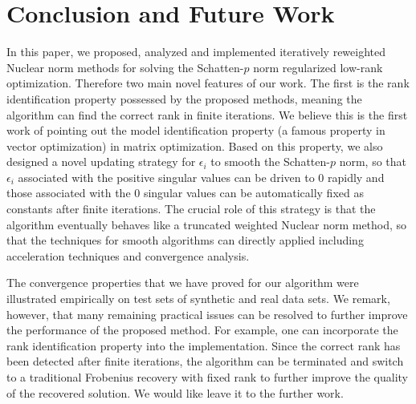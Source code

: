 \documentclass[twoside,11pt]{article}
\numberwithin{equation}{section}
\begin{document}
%
%
%
%
%
%
%






\section{Conclusion and Future Work}
In this paper, we proposed, analyzed and implemented iteratively reweighted Nuclear norm methods 
for solving the Schatten-$p$ norm regularized low-rank optimization. 
Therefore two main novel features of our work.   The first is the 
rank identification property possessed by the proposed methods, meaning the algorithm can find the 
correct rank in finite iterations.  We believe this is the first work of 
pointing out the model identification property (a famous property in vector optimization) in 
matrix optimization.  Based on this property,  we also designed a novel updating strategy 
for $\epsilon_i$ to smooth the Schatten-$p$ norm, so that $\epsilon_i$ associated with the positive 
singular values can be driven to 0 rapidly and those associated with the 0 singular values can be 
automatically  fixed  as constants after finite iterations. The crucial role of this strategy is that the algorithm 
eventually behaves like a truncated weighted Nuclear norm method, so that the techniques for smooth 
algorithms can directly applied including acceleration techniques and convergence analysis. 

The convergence properties that we have proved for our algorithm were illustrated empirically on 
test sets of synthetic and real data sets. We remark, however, that many remaining practical issues 
 can be resolved to further improve the performance of the proposed method.  For example,  
 one can incorporate the rank identification property into the implementation. Since the correct 
 rank has been detected after finite iterations, the algorithm can be terminated and switch to a 
 traditional Frobenius recovery with fixed rank to further improve the quality of the recovered solution. 
 We would like leave it to the further work. 
\end{document}
